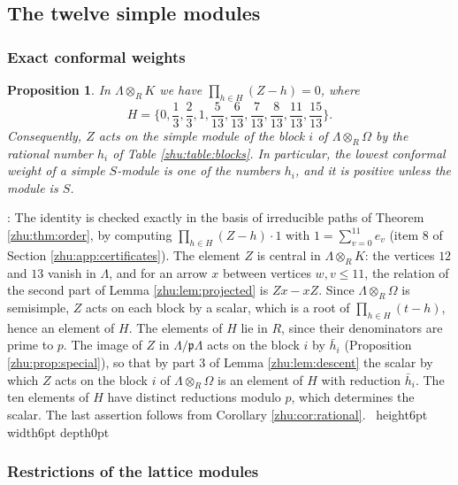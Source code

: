 \documentclass[leqno]{article}
\renewcommand{\leq}{\ensuremath{\leqslant}}
\newcommand{\qed}{\hfill \vrule height6pt  width6pt depth0pt}
\newcommand{\ot}{\otimes}
\newtheorem{prop}[thm]{Proposition}
\newenvironment{proof}[1][]{\noindent {\it Proof #1} : }{\hbox{~}\qed
\smallskip
}
\numberwithin{equation}{section}
\begin{document}
\subsection{The twelve simple modules}
\label{zhu:sec:modules}

\subsubsection{Exact conformal weights}
\label{zhu:subsec:exact-h}

\begin{prop}
\label{zhu:prop:exact-h}
In $\Lambda \ot_R K$ we have $\prod_{h \in H} (Z - h) = 0$, where
\[
H = \Big\{0, \frac13, \frac23, 1, \frac{5}{13}, \frac{6}{13}, \frac{7}{13}, \frac{8}{13}, \frac{11}{13}, \frac{15}{13}\Big\}.
\] Consequently, $Z$ acts on the simple module of the block $i$ of $\Lambda \ot_R \Omega$ by the rational number $h_i$ of Table \ref{zhu:table:blocks}. In particular, the lowest conformal weight of a simple $S$-module is one of the numbers $h_i$, and it is positive unless the module is $S$.
\end{prop}

\begin{proof}
The identity is checked exactly in the basis of irreducible paths of Theorem \ref{zhu:thm:order}, by computing $\prod_{h \in H}(Z-h)\cdot 1$ with $1 = \sum_{v=0}^{11} e_v$ (item 8 of Section \ref{zhu:app:certificates}). The element $Z$ is central in $\Lambda \ot_R K$: the vertices $12$ and $13$ vanish in $\Lambda$, and for an arrow $x$ between vertices $w, v \leq 11$, the relation of the second part of Lemma \ref{zhu:lem:projected} is $Zx - xZ$. Since $\Lambda \ot_R \Omega$ is semisimple, $Z$ acts on each block by a scalar, which is a root of $\prod_{h \in H}(t-h)$, hence an element of $H$. The elements of $H$ lie in $R$, since their denominators are prime to $p$. The image of $Z$ in $\Lambda/\mathfrak p\Lambda$ acts on the block $i$ by $\bar h_i$ (Proposition \ref{zhu:prop:special}), so that by part 3 of Lemma \ref{zhu:lem:descent} the scalar by which $Z$ acts on the block $i$ of $\Lambda \ot_R \Omega$ is an element of $H$ with reduction $\bar h_i$. The ten elements of $H$ have distinct reductions modulo $p$, which determines the scalar. The last assertion follows from Corollary \ref{zhu:cor:rational}.
\end{proof}

\subsubsection{Restrictions of the lattice modules}
\label{zhu:subsec:restrictions}
\end{document}
